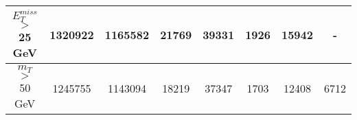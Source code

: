 \documentclass[10pt]{article}
\begin{document}
\begin{center}
\begin{table}[H]
\begin{adjustbox}{width=1\textwidth}
\begin{tabular}{cccccccc}
\multicolumn{1}{|c|}{$E_{T}^{miss}$ $>$ 25 GeV}  & \multicolumn{1}{c|}{1320922} & \multicolumn{1}{c|}{1165582} & \multicolumn{1}{c|}{21769} & \multicolumn{1}{c|}{39331} & \multicolumn{1}{c|}{1926} & \multicolumn{1}{c|}{15942} & \multicolumn{1}{c|}{-}  \\ \hline 
\multicolumn{1}{|c|}{$m_{T}$ $>$ 50 GeV}  & \multicolumn{1}{c|}{1245755} & \multicolumn{1}{c|}{1143094} & \multicolumn{1}{c|}{18219} & \multicolumn{1}{c|}{37347} & \multicolumn{1}{c|}{1703} & \multicolumn{1}{c|}{12408} & \multicolumn{1}{c|}{6712}  \\ \hline 
\end{tabular} 										
\end{adjustbox}										
\end{table} 											
\end{center}											
\end{document}

